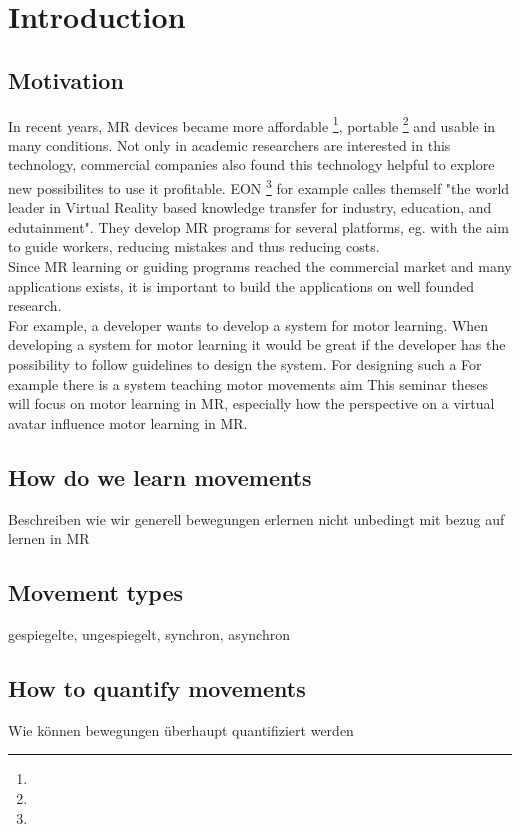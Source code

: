 \chapter{Introduction}

\section{Motivation}
In recent years, MR devices became more affordable \footnote{\todo}, portable \footnote{\todo} and usable in many conditions. Not only in academic researchers are interested in this technology, commercial companies also found this technology helpful to explore new possibilites to use it profitable. EON \footnote{\todo} for example calles themself "the world leader in Virtual Reality based knowledge transfer for industry, education, and edutainment". They develop MR programs for several platforms, eg. with the aim to guide workers, reducing mistakes and thus reducing costs.\\
Since MR learning or guiding programs reached the commercial market and many applications exists, it is important to build the applications on well founded research.\\
For example, a developer wants to develop a system for motor learning. 
When developing a system for motor learning it would be great if the developer has the possibility to follow guidelines to design the system. For designing such a
For example there is a system teaching motor movements
aim
This seminar theses will focus on motor learning in MR, especially how the perspective on a virtual avatar influence motor learning in MR.


\section{How do we learn movements}
Beschreiben wie wir generell bewegungen erlernen nicht unbedingt mit bezug auf lernen in MR

\section{Movement types}
gespiegelte, ungespiegelt, synchron, asynchron

\section{How to quantify movements}
Wie können bewegungen überhaupt quantifiziert werden

